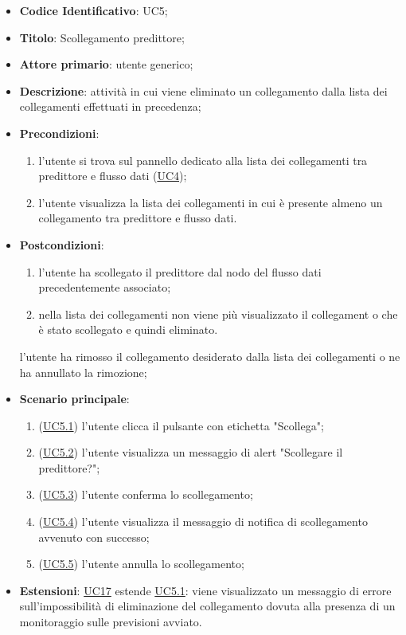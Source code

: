		\begin{itemize}
			\item\textbf{Codice Identificativo}: UC5;
			\item\textbf{Titolo}: Scollegamento predittore;
			\item\textbf{Attore primario}: utente generico;
			\item\textbf{Descrizione}: attività in cui viene eliminato un collegamento dalla lista dei collegamenti effettuati in precedenza;
			\item\textbf{Precondizioni}:
			\begin{enumerate}
			\item l'utente si trova sul pannello dedicato alla lista dei collegamenti tra predittore e
flusso dati (\hyperref[par:UC4]{UC4});
			\item  l'utente visualizza la lista dei collegamenti in cui è presente almeno un collegamento tra predittore e flusso dati.	
\end{enumerate}			
			\item\textbf{Postcondizioni}: 
			\begin{enumerate}
				\item l'utente ha scollegato il predittore dal nodo del flusso dati precedentemente associato;
				\item nella lista dei collegamenti non viene più visualizzato il collegament
				o che è stato
scollegato e quindi eliminato.
			\end{enumerate}
			l'utente ha rimosso il collegamento desiderato dalla lista dei collegamenti o ne ha annullato la rimozione;
			\item\textbf{Scenario principale}:
			\begin{enumerate}
				\item (\hyperref[par:UC5.1]{UC5.1}) l'utente clicca il pulsante con etichetta "Scollega";
				\item (\hyperref[par:UC5.2]{UC5.2}) l'utente visualizza un messaggio di alert "Scollegare il predittore?";
				\item (\hyperref[par:UC5.3]{UC5.3}) l'utente conferma lo scollegamento;
				\item (\hyperref[par:UC5.4]{UC5.4}) l'utente visualizza il messaggio di notifica di scollegamento avvenuto con successo;
				\item (\hyperref[par:UC5.5]{UC5.5}) l'utente annulla lo scollegamento;
			\end{enumerate}	
			\item\textbf{Estensioni}: \hyperref[par:UC17]{UC17} estende \hyperref[par:UC5.1]{UC5.1}: viene visualizzato un messaggio di errore sull'impossibilità di eliminazione del collegamento dovuta alla presenza di un monitoraggio sulle previsioni avviato.		
			\end{itemize}
			
